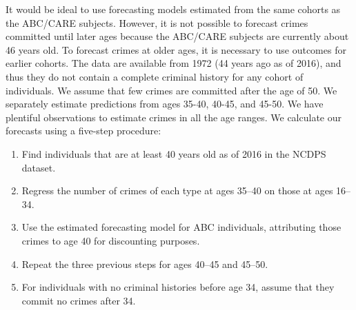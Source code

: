 It would be ideal to use forecasting models estimated from the same cohorts as the ABC/CARE subjects. However, it is not possible to forecast crimes committed until later ages because the ABC/CARE subjects are currently about 46 years old. To forecast crimes at older ages, it is necessary to use outcomes for earlier cohorts. The data are available from 1972 (44 years ago as of 2016), and thus they do not contain a complete criminal history for any cohort of individuals.
We assume that few crimes are committed after the age of 50.
 We separately estimate predictions from ages 35-40, 40-45, and 45-50. We have plentiful observations to estimate crimes in all the age ranges. %
We calculate our forecasts using a five-step procedure:
\begin{enumerate}
\item Find individuals that are at least 40 years old as of 2016 in the NCDPS dataset.
\item Regress the number of crimes of each type at ages 35--40 on those at ages 16--34.
\item Use the estimated forecasting model for ABC individuals, attributing those crimes to age 40 for discounting purposes.
\item Repeat the three previous steps for ages 40--45 and 45--50. %
\item For individuals with no criminal histories before age 34, assume that they commit no crimes after 34.
\end{enumerate}

